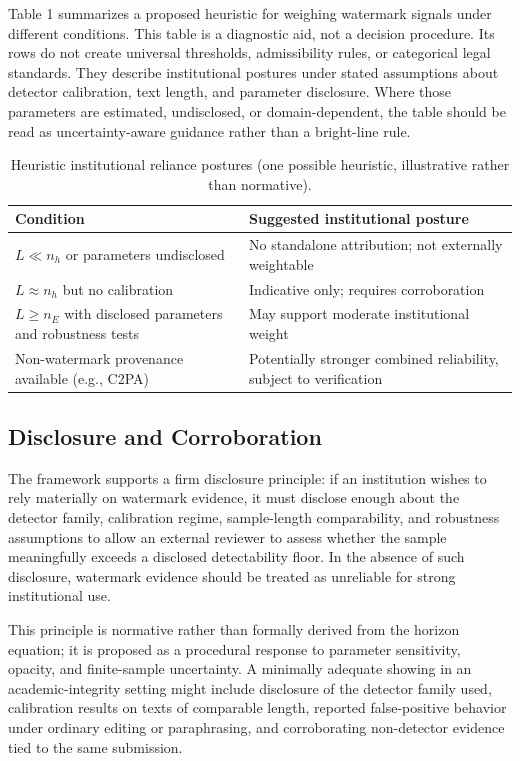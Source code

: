 \documentclass[11pt]{article}
\begin{document}
Table 1 summarizes a proposed heuristic for weighing watermark signals under
different conditions. This table is a diagnostic aid, not a decision procedure. Its
rows do not create universal thresholds, admissibility rules, or categorical legal
standards. They describe institutional postures under stated assumptions about
detector calibration, text length, and parameter disclosure. Where those parameters
are estimated, undisclosed, or domain-dependent, the table should be read as
uncertainty-aware guidance rather than a bright-line rule.

\begin{table}[h]
\centering
\caption{Heuristic institutional reliance postures (one possible heuristic,
illustrative rather than normative).}
\begin{tabular}{p{}p{}}
\toprule
\textbf{Condition} & \textbf{Suggested institutional posture}\\
\midrule
$L \ll n_h$ or parameters undisclosed & No standalone attribution; not externally
weightable\\
$L \approx n_h$ but no calibration & Indicative only; requires corroboration\\
$L \geq n_E$ with disclosed parameters and robustness tests & May support moderate
institutional weight\\
Non-watermark provenance available (e.g., C2PA) & Potentially stronger combined
reliability, subject to verification\\
\bottomrule
\end{tabular}
\end{table}

\subsection{Disclosure and Corroboration}

The framework supports a firm disclosure principle: if an institution wishes to rely
materially on watermark evidence, it must disclose enough about the detector family,
calibration regime, sample-length comparability, and robustness assumptions to allow
an external reviewer to assess whether the sample meaningfully exceeds a disclosed
detectability floor. In the absence of such disclosure, watermark evidence should be
treated as unreliable for strong institutional use.

This principle is normative rather than formally derived from the horizon equation;
it is proposed as a procedural response to parameter sensitivity, opacity, and
finite-sample uncertainty. A minimally adequate showing in an academic-integrity
setting might include disclosure of the detector family used, calibration results on
texts of comparable length, reported false-positive behavior under ordinary editing
or paraphrasing, and corroborating non-detector evidence tied to the same
submission.
\end{document}
